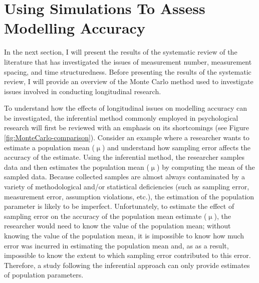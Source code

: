 \documentclass[
12pt, %
twoside,
english]{guelphthesis}
\theoremstyle{definition}
\theoremstyle{definition}
\theoremstyle{definition}
\theoremstyle{definition}
\theoremstyle{remark}
\begin{document}
\hypertarget{using-simulations-to-assess-modelling-accuracy}{%
\section{Using Simulations To Assess Modelling Accuracy}\label{using-simulations-to-assess-modelling-accuracy}}

In the next section, I will present the results of the systematic review of the literature that has investigated the issues of measurement number, measurement spacing, and time structuredness. Before presenting the results of the systematic review, I will provide an overview of the Monte Carlo method used to investigate issues involved in conducting longitudinal research.

To understand how the effects of longitudinal issues on modelling accuracy can be investigated, the inferential method commonly employed in psychological research will first be reviewed with an emphasis on its shortcomings (see Figure \ref{fig:MonteCarlo-comparison}). Consider an example where a researcher wants to estimate a population mean (\(\upmu\)) and understand how sampling error affects the accuracy of the estimate. Using the inferential method, the researcher samples data and then estimates the population mean (\(\upmu\)) by computing the mean of the sampled data. Because collected samples are almost always contaminated by a variety of methodological and/or statistical deficiencies (such as sampling error, measurement error, assumption violations, etc.), the estimation of the population parameter is likely to be imperfect. Unfortunately, to estimate the effect of sampling error on the accuracy of the population mean estimate (\(\upmu\)), the researcher would need to know the value of the population mean; without knowing the value of the population mean, it is impossible to know how much error was incurred in estimating the population mean and, as as a result, impossible to know the extent to which sampling error contributed to this error. Therefore, a study following the inferential approach can only provide estimates of population parameters.
\end{document}
